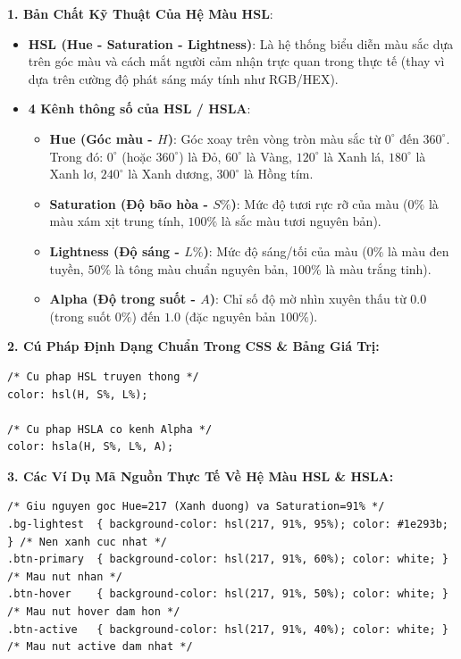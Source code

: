 \documentclass[11pt,oneside]{book}
\begin{document}
\begin{conceptBox}
\textbf{1. Bản Chất Kỹ Thuật Của Hệ Màu HSL}:
\begin{itemize}[leftmargin=1.5em, itemsep=3pt, parsep=0pt]
    \item \textbf{HSL (Hue - Saturation - Lightness)}: Là hệ thống biểu diễn màu sắc dựa trên góc màu và cách mắt người cảm nhận trực quan trong thực tế (thay vì dựa trên cường độ phát sáng máy tính như RGB/HEX).
    \item \textbf{4 Kênh thông số của HSL / HSLA}:
    \begin{itemize}[leftmargin=1.2em, itemsep=2pt]
        \item \textbf{Hue (Góc màu - $H$)}: Góc xoay trên vòng tròn màu sắc từ $0^\circ$ đến $360^\circ$. Trong đó: $0^\circ$ (hoặc $360^\circ$) là Đỏ, $60^\circ$ là Vàng, $120^\circ$ là Xanh lá, $180^\circ$ là Xanh lơ, $240^\circ$ là Xanh dương, $300^\circ$ là Hồng tím.
        \item \textbf{Saturation (Độ bão hòa - $S\%$)}: Mức độ tươi rực rỡ của màu ($0\%$ là màu xám xịt trung tính, $100\%$ là sắc màu tươi nguyên bản).
        \item \textbf{Lightness (Độ sáng - $L\%$)}: Mức độ sáng/tối của màu ($0\%$ là màu đen tuyền, $50\%$ là tông màu chuẩn nguyên bản, $100\%$ là màu trắng tinh).
        \item \textbf{Alpha (Độ trong suốt - $A$)}: Chỉ số độ mờ nhìn xuyên thấu từ $0.0$ (trong suốt $0\%$) đến $1.0$ (đặc nguyên bản $100\%$).
    \end{itemize}
\end{itemize}
\end{conceptBox}

\textbf{2. Cú Pháp Định Dạng Chuẩn Trong CSS \& Bảng Giá Trị:}

\begin{codeWindow}
\begin{lstlisting}[language=CSS3]
/* Cu phap HSL truyen thong */
color: hsl(H, S%, L%);

/* Cu phap HSLA co kenh Alpha */
color: hsla(H, S%, L%, A);
\end{lstlisting}
\end{codeWindow}

\textbf{3. Các Ví Dụ Mã Nguồn Thực Tế Về Hệ Màu HSL \& HSLA:}

\begin{codeWindow}
\begin{lstlisting}[language=CSS3]
/* Giu nguyen goc Hue=217 (Xanh duong) va Saturation=91% */
.bg-lightest  { background-color: hsl(217, 91%, 95%); color: #1e293b; } /* Nen xanh cuc nhat */
.btn-primary  { background-color: hsl(217, 91%, 60%); color: white; }   /* Mau nut nhan */
.btn-hover    { background-color: hsl(217, 91%, 50%); color: white; }   /* Mau nut hover dam hon */
.btn-active   { background-color: hsl(217, 91%, 40%); color: white; }   /* Mau nut active dam nhat */
\end{lstlisting}
\end{codeWindow}
\end{document}
